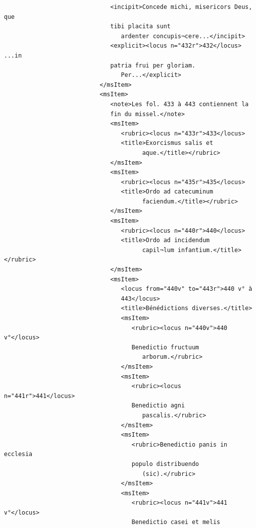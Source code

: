 \documentclass[a4paper,12pt,twoside]{book}
\begin{document}
\begin{verbatim}
                              <incipit>Concede michi, misericors Deus, que 
                              tibi placita sunt
                                 ardenter concupis¬cere...</incipit>
                              <explicit><locus n="432r">432</locus> ...in 
                              patria frui per gloriam.
                                 Per...</explicit>
                           </msItem>
                           <msItem>
                              <note>Les fol. 433 à 443 contiennent la 
                              fin du missel.</note>
                              <msItem>
                                 <rubric><locus n="433r">433</locus>
                                 <title>Exorcismus salis et
                                       aque.</title></rubric>
                              </msItem>
                              <msItem>
                                 <rubric><locus n="435r">435</locus>
                                 <title>Ordo ad catecuminum
                                       faciendum.</title></rubric>
                              </msItem>
                              <msItem>
                                 <rubric><locus n="440r">440</locus>
                                 <title>Ordo ad incidendum
                                       capil¬lum infantium.</title></rubric>
                              </msItem>
                              <msItem>
                                 <locus from="440v" to="443r">440 v° à
                                 443</locus>
                                 <title>Bénédictions diverses.</title>
                                 <msItem>
                                    <rubric><locus n="440v">440 v°</locus>
                                    Benedictio fructuum
                                       arborum.</rubric>
                                 </msItem>
                                 <msItem>
                                    <rubric><locus n="441r">441</locus> 
                                    Benedictio agni
                                       pascalis.</rubric>
                                 </msItem>
                                 <msItem>
                                    <rubric>Benedictio panis in ecclesia 
                                    populo distribuendo
                                       (sic).</rubric>
                                 </msItem>
                                 <msItem>
                                    <rubric><locus n="441v">441 v°</locus>
                                    Benedictio casei et melis

\end{verbatim}
\end{document}
